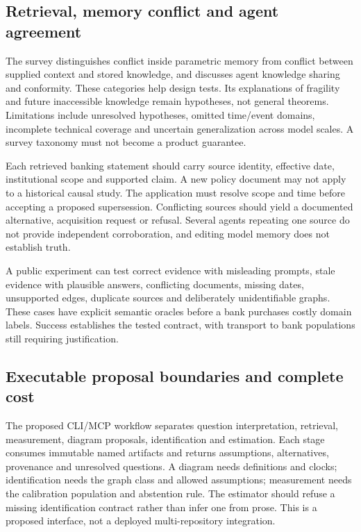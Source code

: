 \subsection{Retrieval, memory conflict and agent agreement}
The survey distinguishes conflict inside parametric memory from conflict between supplied context and stored knowledge, and discusses agent knowledge sharing and conformity. These categories help design tests. Its explanations of fragility and future inaccessible knowledge remain hypotheses, not general theorems. Limitations include unresolved hypotheses, omitted time/event domains, incomplete technical coverage and uncertain generalization across model scales. A survey taxonomy must not become a product guarantee.\citep{exec24_knowledge_original}

Each retrieved banking statement should carry source identity, effective date, institutional scope and supported claim. A new policy document may not apply to a historical causal study. The application must resolve scope and time before accepting a proposed supersession. Conflicting sources should yield a documented alternative, acquisition request or refusal. Several agents repeating one source do not provide independent corroboration, and editing model memory does not establish truth.\citep{exec24_css_knowledge_reference}

A public experiment can test correct evidence with misleading prompts, stale evidence with plausible answers, conflicting documents, missing dates, unsupported edges, duplicate sources and deliberately unidentifiable graphs. These cases have explicit semantic oracles before a bank purchases costly domain labels. Success establishes the tested contract, with transport to bank populations still requiring justification.\citep{exec24_css_knowledge_reference}

\subsection{Executable proposal boundaries and complete cost}
The proposed CLI/MCP workflow separates question interpretation, retrieval, measurement, diagram proposals, identification and estimation. Each stage consumes immutable named artifacts and returns assumptions, alternatives, provenance and unresolved questions. A diagram needs definitions and clocks; identification needs the graph class and allowed assumptions; measurement needs the calibration population and abstention rule. The estimator should refuse a missing identification contract rather than infer one from prose. This is a proposed interface, not a deployed multi-repository integration.\citep{exec24_css_knowledge_reference}

